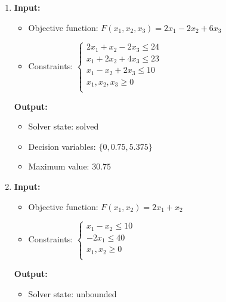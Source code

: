 \documentclass{article}
\newcommand{\Gap}{0.25in}
\begin{document}
\begin{enumerate}[label={(\arabic*)}]
          \vspace{\Gap}

    \item \textbf{Input:}
          \begin{itemize}
              \item Objective function: \(F(x_1, x_2, x_3) = 2 x_1 - 2 x_2 + 6 x_3\)
              \item Constraints: \(\begin{cases}
                        2 x_1 + x_2 - 2 x_3 \le 24 \\
                        x_1 + 2 x_2 + 4 x_3 \le 23 \\
                        x_1 - x_2 + 2 x_3 \le 10   \\
                        x_1, x_2, x_3 \ge 0        \\
                    \end{cases}\)
          \end{itemize}

          \textbf{Output:}
          \begin{itemize}
              \item Solver state: solved
              \item Decision variables: \({\{ 0, 0.75, 5.375 \}}\)
              \item Maximum value: \(30.75\)
          \end{itemize}

          \vspace{\Gap}

    \item \textbf{Input:}
          \begin{itemize}
              \item Objective function: \(F(x_1, x_2) = 2 x_1 + x_2\)
              \item Constraints: \(\begin{cases}
                        x_1 - x_2 \le 10 \\
                        -2 x_1 \le 40    \\
                        x_1, x_2 \ge 0   \\
                    \end{cases}\)
          \end{itemize}

          \textbf{Output:}
          \begin{itemize}
              \item Solver state: unbounded
          \end{itemize}


\end{enumerate}
\end{document}
